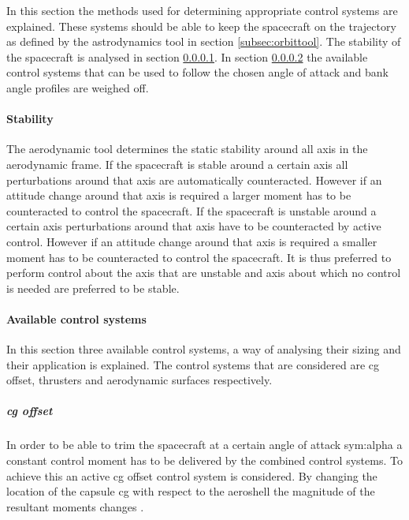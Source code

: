 In this section the methods used for determining appropriate control systems are explained. These systems should be able to keep the spacecraft on the trajectory as defined by the astrodynamics tool in section \ref{subsec:orbittool}. %
The stability of the spacecraft is analysed in section \ref{control:stab}. In section \ref{control:system} the available control systems that can be used to follow the chosen angle of attack and bank angle profiles are weighed off.

%

\paragraph{Stability}
\label{control:stab}

The aerodynamic tool determines the static stability around all axis in the aerodynamic frame. If the spacecraft is stable around a certain axis all perturbations around that axis are automatically counteracted. However if an attitude change around that axis is required a larger moment has to be counteracted to control the spacecraft.  If the spacecraft is unstable around a certain axis perturbations around that axis have to be counteracted by active control. However if an attitude change around that axis is required a smaller moment has to be counteracted to control the spacecraft. It is thus preferred to perform control about the axis that are unstable and axis about which no control is needed are preferred to be stable.

\paragraph{Available control systems}
\label{control:system}

In this section three available control systems, a way of analysing their sizing and their application is explained. The control systems that are considered are \gls{cg} offset, thrusters and aerodynamic surfaces respectively.

\subparagraph{\acrlong{cg} offset}

In order to be able to trim the spacecraft at a certain angle of attack \gls{sym:alpha} a constant control moment has to be delivered by the combined control systems. To achieve this an active \gls{cg} offset control system is considered. By changing the location of the capsule \gls{cg} with respect to the aeroshell the magnitude of the resultant moments changes \cite{Mulqueen1991}. 

